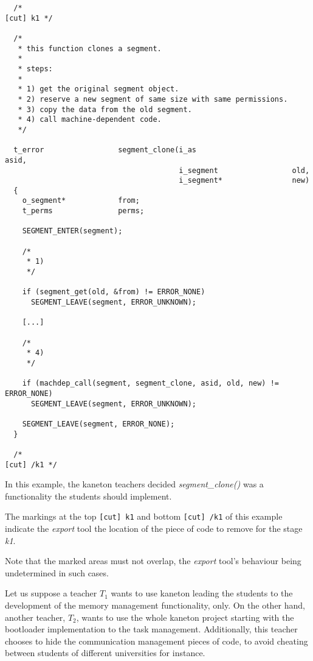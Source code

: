 \begin{verbatim}
  /*                                                                [cut] k1 */

  /*
   * this function clones a segment.
   *
   * steps:
   *
   * 1) get the original segment object.
   * 2) reserve a new segment of same size with same permissions.
   * 3) copy the data from the old segment.
   * 4) call machine-dependent code.
   */

  t_error                 segment_clone(i_as                      asid,
                                        i_segment                 old,
                                        i_segment*                new)
  {
    o_segment*            from;
    t_perms               perms;

    SEGMENT_ENTER(segment);

    /*
     * 1)
     */

    if (segment_get(old, &from) != ERROR_NONE)
      SEGMENT_LEAVE(segment, ERROR_UNKNOWN);

    [...]

    /*
     * 4)
     */

    if (machdep_call(segment, segment_clone, asid, old, new) != ERROR_NONE)
      SEGMENT_LEAVE(segment, ERROR_UNKNOWN);

    SEGMENT_LEAVE(segment, ERROR_NONE);
  }

  /*                                                               [cut] /k1 */
\end{verbatim}

In this example, the kaneton teachers decided \textit{segment\_clone()}
was a functionality the students should implement.

The markings at the top \verb|[cut] k1| and bottom \verb|[cut] /k1| of this
example indicate the \textit{export} tool the location of the piece of code
to remove for the stage \textit{k1}.

Note that the marked areas must not overlap, the \textit{export} tool's
behaviour being undetermined in such cases.

Let us suppose a teacher $T_{1}$ wants to use kaneton leading the students to
the development of the memory management functionality, only. On the other
hand, another teacher, $T_{2}$, wants to use the whole kaneton project starting
with the bootloader implementation to the task management. Additionally,
this teacher chooses to hide the communication management pieces of code,
to avoid cheating between students of different universities for instance.

